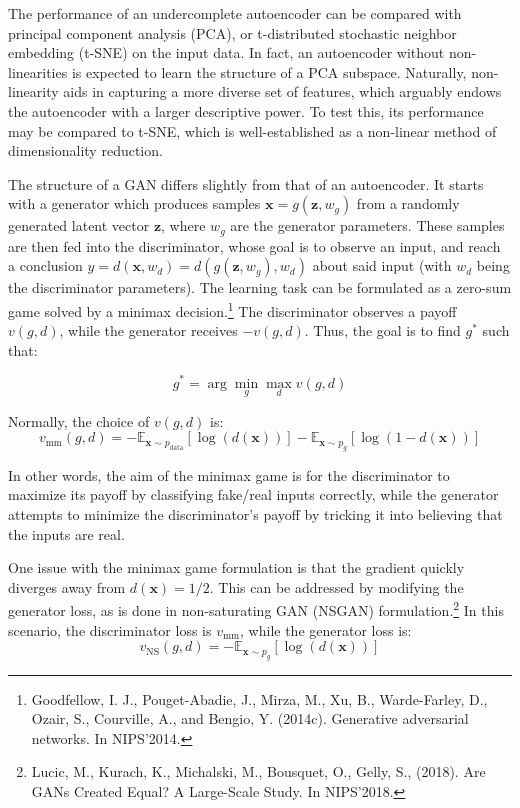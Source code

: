 \documentclass[11pt]{article} %
\begin{document}
\noindent The performance of an undercomplete autoencoder can be compared with principal component analysis (PCA), or t-distributed stochastic neighbor embedding (t-SNE) on the input data. In fact, an autoencoder without non-linearities is expected to learn the structure of a PCA subspace. Naturally, non-linearity aids in capturing a more diverse set of features, which arguably endows the autoencoder with a larger descriptive power. To test this, its performance may be compared to t-SNE, which is well-established as a non-linear method of dimensionality reduction.

\noindent The structure of a GAN differs slightly from that of an autoencoder. It starts with a generator which produces samples $\mathbf{x} = g(\mathbf{z},w_{g})$ from a randomly generated latent vector $\mathbf{z}$, where $w_{g}$ are the generator parameters. These samples are then fed into the discriminator, whose goal is to observe an input, and reach a conclusion $y = d(\mathbf{x}, w_{d}) = d(g(\mathbf{z},w_{g}), w_{d})$ about said input (with $w_{d}$ being the discriminator parameters). The learning task can be formulated as a zero-sum game solved by a minimax decision.\footnote{Goodfellow, I. J., Pouget-Abadie, J., Mirza, M., Xu, B., Warde-Farley, D., Ozair, S.,
Courville, A., and Bengio, Y. (2014c). Generative adversarial networks. In NIPS’2014.} The discriminator observes a payoff $v(g, d)$, while the generator receives $-v(g,d)$. Thus, the goal is to find $g^*$ such that:

\begin{equation}
    g^* = \arg\min_{g}\max_{d} v(g,d)
\end{equation}

Normally, the choice of $v(g, d)$ is:
\begin{equation}
    v_{\text{mm}}(g,d) = - \mathbb{E}_{\mathbf{x}\sim p_{\text{data}}}[\log(d(\mathbf{x}))] - \mathbb{E}_{\mathbf{x}\sim p_{g}}[\log(1 - d(\mathbf{x}))]
\end{equation}

In other words, the aim of the minimax game is for the discriminator to maximize its payoff by classifying fake/real inputs correctly, while the generator attempts to minimize the discriminator's payoff by tricking it into believing that the inputs are real.

\noindent One issue with the minimax game formulation is that the gradient quickly diverges away from $d(\mathbf{x}) = 1/2$. This can be addressed by modifying the generator loss, as is done in non-saturating GAN (NSGAN) formulation.\footnote{Lucic, M., Kurach, K., Michalski, M., Bousquet, O., Gelly, S.,  (2018). Are GANs Created Equal? A Large-Scale Study. In NIPS'2018.} In this scenario, the discriminator loss is $v_{\text{mm}}$, while the generator loss is:
\begin{equation}
    v_{\text{NS}}(g,d) = - \mathbb{E}_{\mathbf{x}\sim p_{g}}[\log(d(\mathbf{x}))]
\end{equation}
\end{document}
